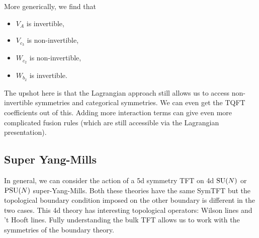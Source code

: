 More generically, we find that 
\begin{itemize}
	\item $V_A$ is invertible,
 	\item $V_{c_3}$ is non-invertible,
  	\item $W_{c_2}$ is non-invertible,
   	\item $W_{b_2}$ is invertible.
\end{itemize}

The upshot here is that the Lagrangian approach still allows us to access non-invertible symmetries and categorical symmetries. We can even get the TQFT coefficients out of this.
Adding more interaction terms can give even more complicated fusion rules (which are still accessible via the Lagrangian presentation).

\subsection{Super Yang-Mills}

In general, we can consider the action of a 5d symmetry TFT on 4d $\mathrm{SU}(N)$ or $\mathrm{PSU}(N)$ super-Yang-Mills. Both these theories have the same SymTFT but the topological boundary condition imposed on the other boundary is different in the two cases.
This 4d theory has interesting topological operators: Wilson lines and 't Hooft lines.
Fully understanding the bulk TFT allows us to work with the symmetries of the boundary theory.
